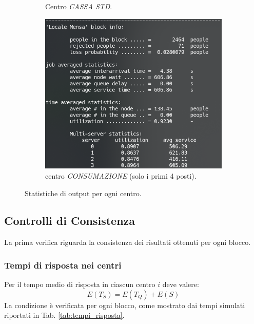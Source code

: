 \documentclass{article}
\begin{document}
\begin{figure}[H]
\begin{subfigure}{.5\textwidth}
  \caption{Centro \textit{CASSA STD}.}
  \label{fig:cassa_std}
\end{subfigure}
\begin{subfigure}{.5\textwidth}
  \centering
  \includegraphics[width=.8\linewidth]{img/consumazione.png}
  \caption{centro \textit{CONSUMAZIONE} (solo i primi 4 posti).}
  \label{fig:consumazione}
\end{subfigure}
\caption{Statistiche di output per ogni centro.}
\label{fig:output}
\end{figure}
\FloatBarrier

\subsection{Controlli di Consistenza}

La prima verifica riguarda la consistenza dei risultati ottenuti per ogni blocco.

\subsubsection{Tempi di risposta nei centri}

Per il tempo medio di risposta in ciascun centro $i$ deve valere: 
\[E(T_{S}) = E(T_{Q}) + E(S)\]
La condizione è verificata per ogni blocco, come mostrato dai tempi simulati riportati in Tab. \ref{tab:tempi_risposta}.
\end{document}
